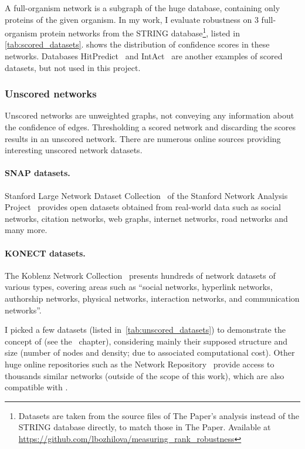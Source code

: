 


A full-organism network is a subgraph of the huge database, containing only proteins of the given organism.
In my work, I evaluate robustness on 3 full-organism protein networks from the STRING database\footnote{Datasets are taken from the source files of The Paper's analysis instead of the STRING database directly, to match those in The Paper. Available at \url{https://github.com/lbozhilova/measuring_rank_robustness}}, listed in \cref{tab:scored_datasets}.
 shows the distribution of confidence scores in these networks.
Databases HitPredict~\cite{LopezHitPredictVersionComprehensive2015} and IntAct~\cite{OrchardMIntActProjectIntAct2014} are another examples of scored datasets, but not used in this project.

\subsubsection*{Unscored networks}\label{sec:unscored_datasets}

Unscored networks are unweighted graphs, not conveying any information about the confidence of edges.
Thresholding a scored network and discarding the scores results in an unscored network.
There are numerous online sources providing interesting unscored network datasets.

\paragraph*{SNAP datasets.} Stanford Large Network Dataset Collection~\cite{Large2016} of the Stanford Network Analysis Project~\cite{LeskovecSNAPGeneralPurpose2016} provides open datasets obtained from real-world data such as social networks, citation networks, web graphs, internet networks, road networks and many more.

\paragraph*{KONECT datasets.} The Koblenz Network Collection~\cite{Kunegis2013} presents hundreds of network datasets of various types, covering areas such as \enquote{social networks, hyperlink networks, authorship networks, physical networks, interaction networks, and communication networks}.

I picked a few datasets (listed in~\cref{tab:unscored_datasets}) to demonstrate the concept of \graffs (see the~ chapter), considering mainly their supposed structure and size (number of nodes and density; due to associated computational cost).
Other huge online repositories such as the Network Repository~\cite{RossiNetworkDataRepository2015} provide access to thousands similar networks (outside of the scope of this work), which are also compatible with \graffs.

